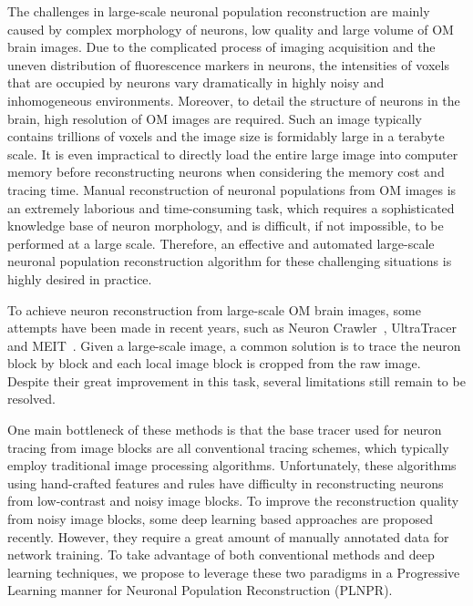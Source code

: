 The challenges in large-scale neuronal population reconstruction are mainly caused by complex morphology of neurons, low quality and large volume of OM brain images.
Due to the complicated process of imaging acquisition and the uneven distribution of fluorescence markers in neurons, the intensities of voxels that are occupied by neurons vary dramatically in highly noisy and inhomogeneous environments.
Moreover, to detail the structure of neurons in the brain, high resolution of OM images are required. Such an image typically contains trillions of voxels and the image size is formidably large in a terabyte scale. It is even impractical to directly load the entire large image into computer memory before reconstructing neurons when considering the memory cost and tracing time.
Manual reconstruction of neuronal populations from OM images is an extremely laborious and time-consuming task, which requires a sophisticated knowledge base of neuron morphology, and is difficult, if not impossible, to be performed at a large scale.
Therefore, an effective and automated large-scale neuronal population reconstruction algorithm for these challenging situations is highly desired in practice.


To achieve neuron reconstruction from large-scale OM brain images, some attempts have been made in recent years, such as Neuron Crawler~\cite{Zhou2015}, UltraTracer~\cite{Peng2017} and MEIT~\cite{Wang2018}.
Given a large-scale image, a common solution is to trace the neuron block by block and each local image block is cropped from the raw image.
Despite their great improvement in this task, several limitations still remain to be resolved.


One main bottleneck of these methods is that the base tracer used for neuron tracing from image blocks are all conventional tracing schemes, which typically employ traditional image processing algorithms. Unfortunately, these algorithms using hand-crafted features and rules have difficulty in reconstructing neurons from low-contrast and noisy image blocks.
To improve the reconstruction quality from noisy image blocks, some deep learning based approaches are proposed recently. However, they require a great amount of manually annotated data for network training.
%
To take advantage of both conventional methods and deep learning techniques, we propose to leverage these two paradigms in a Progressive Learning manner for Neuronal Population Reconstruction (PLNPR).

